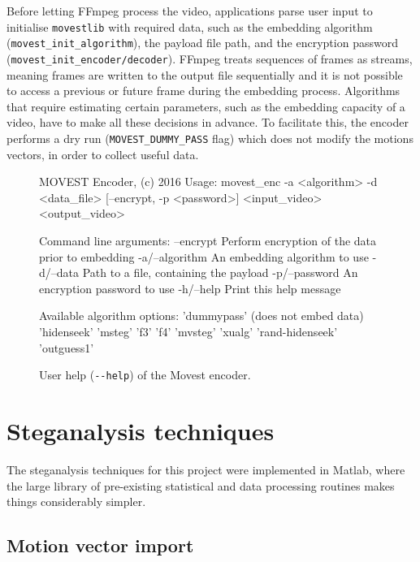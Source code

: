 \documentclass[12pt,british,twoside,notitlepage,usenames,dvipsnames,hypens,final]{report}
\numberwithin{equation}{section}
\numberwithin{figure}{section}
\renewenvironment{alltt}{\vspace{-0.6\baselineskip}\begin{oldalltt}}{\end{oldalltt}\vspace{-0.1\baselineskip}}
\begin{document}
Before letting FFmpeg process the video, applications parse user input to initialise \texttt{movestlib} with required data, such as the embedding algorithm (\texttt{movest\_init\_algorithm}), the payload file path, and the encryption password (\texttt{movest\_init\_encoder/decoder}). FFmpeg treats sequences of frames as streams, meaning frames are written to the output file sequentially and it is not possible to access a previous or future frame during the embedding process. Algorithms that require estimating certain parameters, such as the embedding capacity of a video, have to make all these decisions in advance. To facilitate this, the encoder performs a dry run (\texttt{MOVEST\_DUMMY\_PASS} flag) which does not modify the motions vectors, in order to collect useful data.

\begin{figure}[tbh]
\vspace{1em}
\centering
\begin{minipage}{0.9\textwidth}
\begingroup
    \fontsize{10pt}{12pt}\selectfont
\begin{alltt}
MOVEST Encoder, (c) 2016
Usage: movest_enc -a <algorithm> -d <data_file> [--encrypt, -p <password>]
<input_video> <output_video>

Command line arguments:
 --encrypt        Perform encryption of the data prior to embedding
 -a/--algorithm   An embedding algorithm to use
 -d/--data        Path to a file, containing the payload
 -p/--password    An encryption password to use
 -h/--help        Print this help message

Available algorithm options:
 'dummypass' (does not embed data)
 'hidenseek' 'msteg' 'f3' 'f4'
 'mvsteg' 'xualg'
 'rand-hidenseek' 'outguess1'
\end{alltt}
\endgroup
\end{minipage}
\caption{User help (\texttt{-{}-help}) of the Movest encoder.}
\label{fig:encoder-help}
\end{figure}

\section{Steganalysis techniques}
\label{steg-tech}

The steganalysis techniques for this project were implemented in Matlab, where the large library of pre-existing statistical and data processing routines makes things considerably simpler.

\subsection{Motion vector import}
\label{mv-import}
\end{document}
